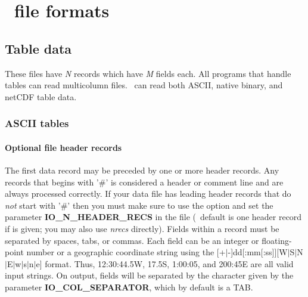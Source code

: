 %
%

\chapter{\gmt\ file formats}
\label{app:B}

\section{Table data}

These files have \emph{N} records which have \emph{M} fields each.
All programs that handle tables can read multicolumn files.  \GMT\ can
read both ASCII, native binary, and netCDF table data.

\subsection{ASCII tables}

\subsubsection{Optional file header records}
The first data record may be preceded by one or more header records.
Any records that begins with '\#' is considered a header or comment
line and are always processed correctly.  If your data file has leading
header records that do \emph{not} start with '\#' then you must
make sure to use the  option and set
the parameter \textbf{IO\_N\_HEADER\_RECS} in the  file
(\GMT\ default is one header record if  is given; you may also
use \emph{nrecs} directly).  Fields
within a record must be separated by spaces, tabs, or commas.
Each field can be an integer or floating-point number or a geographic
coordinate string using the [+$|$-]dd[:mm[:ss]][W$|$S$|$N$|$E$|$w$|$s$|$n$|$e] format.
Thus, 12:30:44.5W, 17.5S, 1:00:05, and 200:45E are all valid input strings.
On output, fields will be separated by the character given by the parameter \textbf{IO\_COL\_SEPARATOR},
which by default is a TAB.

